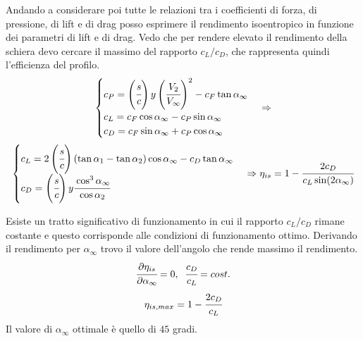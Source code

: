 Andando a considerare poi tutte le relazioni tra i coefficienti di forza, di pressione, di lift e di drag posso esprimere il rendimento isoentropico in funzione dei parametri di lift e di drag.
Vedo che per rendere elevato il rendimento della schiera devo cercare il massimo del rapporto $c_L/c_D$, che rappresenta quindi l'efficienza del profilo.
\begin{align*}
\begin{cases}
c_P = \left(  \cfrac{s}{c} \right) y \left( \cfrac{V_2}{V_{\infty}}  \right)^2 - c_F \tan \alpha_{\infty}\\
c_L = c_F \cos \alpha_{\infty} - c_P \sin \alpha_{\infty}\\
c_D = c_F \sin \alpha_{\infty} + c_P \cos \alpha_{\infty}
\end{cases}
\Rightarrow
\end{align*}
\begin{align*}
\begin{cases}
c_L = 2 \left(  \cfrac{s}{c} \right) (\tan \alpha_1 - \tan \alpha_2) \cos \alpha_{\infty} - c_D \tan \alpha_{\infty}\\
c_D= \left(  \cfrac{s}{c} \right) y \cfrac{\cos^3 \alpha_{\infty}}{\cos \alpha_2}
\end{cases}
\Rightarrow
\eta_{is} = 1- \cfrac{2 c_D}{c_L \sin (2 \alpha_{\infty})}
\end{align*}

Esiste un tratto significativo di funzionamento in cui il rapporto $c_L/c_D$ rimane costante e questo corrisponde alle condizioni di funzionamento ottimo. Derivando il rendimento per $\alpha_{\infty}$ trovo il valore dell'angolo che rende massimo il rendimento.
\begin{align*}
\cfrac{\partial \eta_{is}}{\partial \alpha_{\infty}} = 0, \;\; \cfrac{c_D}{c_L} = cost.
\end{align*}
\begin{align*}
\eta_{is,max} = 1- \cfrac{2 c_D}{c_L}
\end{align*}
Il valore di $\alpha_{\infty}$ ottimale è quello di $45$ gradi.


